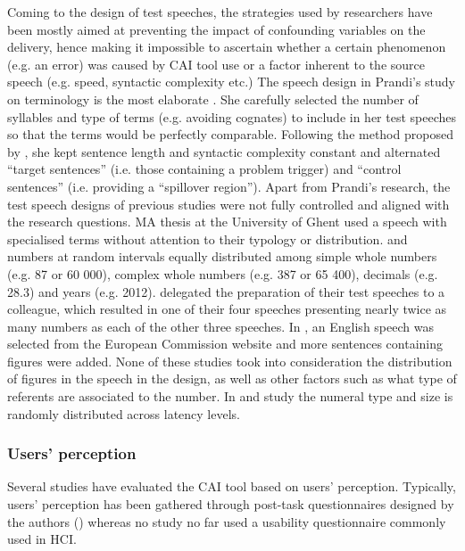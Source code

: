 Coming to the design of test speeches, the strategies used by researchers have been mostly aimed at preventing the impact of confounding variables on the delivery, hence making it impossible to ascertain whether a certain phenomenon (e.g. an error) was caused by CAI tool use or a factor inherent to the source speech (e.g. speed, syntactic complexity etc.) The speech design in Prandi’s study on terminology is the most elaborate \citep{prandi2017designing,prandi2022a}. She carefully selected the number of syllables and type of terms (e.g. avoiding cognates) to include in her test speeches so that the terms would be perfectly comparable. Following the method proposed by \citet{seeber2012cognitive}, she kept sentence length and syntactic complexity constant and alternated ``target sentences'' (i.e. those containing a problem trigger) and ``control sentences'' (i.e. providing a ``spillover region''). Apart from Prandi’s research, the test speech designs of previous studies were not fully controlled and aligned with the research questions.  MA thesis at the University of Ghent used a speech with specialised terms without attention to their typology or distribution. \citet{desmet2018simultaneous} and \citet{canali2019technologie} numbers at random intervals equally distributed among simple whole numbers (e.g. 87 or 60 000), complex whole numbers (e.g. 387 or 65 400), decimals (e.g. 28.3) and years (e.g. 2012). \citet{defrancq2021automatic} delegated the preparation of their test speeches to a colleague, which resulted in one of their four speeches presenting nearly twice as many numbers as each of the other three speeches. In \citet{pisani2021measuring}, an English speech was selected from the European Commission website and more sentences containing figures were added. None of these studies took into consideration the distribution of figures in the speech in the design, as well as other factors such as what type of referents are associated to the number. In  and  study the numeral type and size is randomly distributed  across latency levels.


\subsubsection{Users’ perception}


Several studies have evaluated the CAI tool based on users’ perception. Typically, users’ perception has been gathered through post-task questionnaires designed by the authors (\cite{de2013uso,defrancq2021automatic,desmet2018simultaneous,gacek2015softwarelosungen,pisani2021measuring,prandi2015a,prandi2022a}) whereas no study no far used a usability questionnaire commonly used in HCI.


